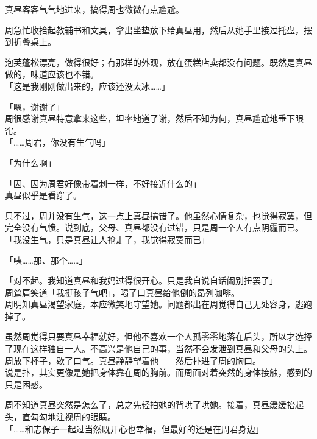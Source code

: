 真昼客客气气地进来，搞得周也微微有点尴尬。

周急忙收拾起教辅书和文具，拿出坐垫放下给真昼用，然后从她手里接过托盘，摆到折叠桌上。

泡芙蓬松漂亮，做得很好；有那样的外观，放在蛋糕店卖都没有问题。既然是真昼做的，味道应该也不错。\\

「这是我刚刚做出来的，应该还没太冰……」

「嗯，谢谢了」\\

周很感谢真昼特意拿来这些，坦率地道了谢，然后不知为何，真昼尴尬地垂下眼帘。\\

「……周君，你没有生气吗」

「为什么啊」

「因、因为周君好像带着刺一样，不好接近什么的」\\

真昼似乎是看穿了。

只不过，周并没有生气，这一点上真昼搞错了。他虽然心情复杂，也觉得寂寞，但完全没有气愤。说到底，父母、真昼都没有过错，只是周一个人有点阴霾而已。\\

「我没生气，只是真昼让人抢走了，我觉得寂寞而已」

「咦……那、那个……」

「对不起。我知道真昼和我妈过得很开心。只是我自说自话闹别扭罢了」\\

周耸肩笑道「我挺孩子气吧」，喝了口真昼给他倒的昂列咖啡。\\

周明知真昼渴望家庭，本应微笑地守望她。问题都出在周觉得自己无处容身，逃跑掉了。

虽然周觉得只要真昼幸福就好，但他不喜欢一个人孤零零地落在后头，所以才选择了现在这样独自一人。不高兴是他自己的事，当然不会发泄到真昼和父母的头上。\\

周放下杯子，歇了口气。真昼静静望着他——然后扑进了周的胸口。\\

说是扑，其实更像是她把身体靠在周的胸前。而周面对着突然的身体接触，感到的只是困惑。

周不知道真昼突然是怎么了，总之先轻拍她的背哄了哄她。接着，真昼缓缓抬起头，直勾勾地注视周的眼睛。\\

「……和志保子一起过当然既开心也幸福，但最好的还是在周君身边」\\

